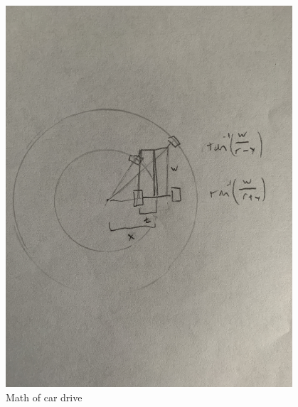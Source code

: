 \begin{figure}[ht]
\begin{minipage}[b]{.48\textwidth}
  \includegraphics[width=0.95\textwidth]{Meetings/September/09-24-22/Hardware_Figure2.JPG}
  \caption{Math of car drive}
  \label{fig:pic2}
\end{minipage}
\end{figure}

